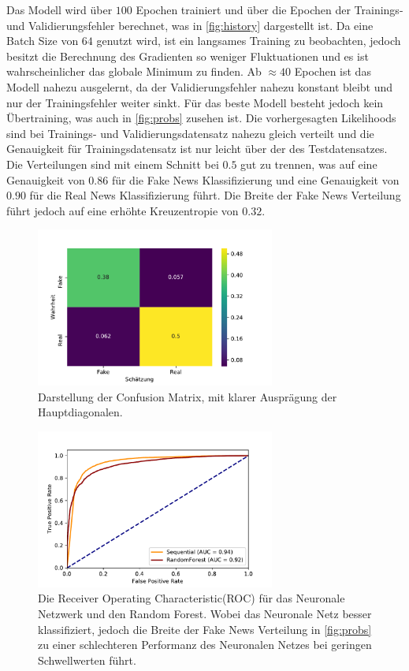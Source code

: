 Das Modell wird über $100$ Epochen trainiert und über die Epochen der Trainings- und Validierungsfehler 
berechnet, was in \autoref{fig:history} dargestellt ist. 
Da eine Batch Size von $64$ genutzt wird, ist ein langsames Training zu beobachten, jedoch besitzt die Berechnung 
des Gradienten so weniger Fluktuationen und es ist wahrscheinlicher das globale Minimum zu finden. 
Ab $\approx 40$ Epochen ist das Modell nahezu ausgelernt, da der Validierungsfehler nahezu konstant bleibt und 
nur der Trainingsfehler weiter sinkt.
Für das beste Modell besteht jedoch kein Übertraining, was auch in \autoref{fig:probs} zusehen ist.
Die vorhergesagten Likelihoods sind bei Trainings- und Validierungsdatensatz nahezu gleich verteilt und die 
Genauigkeit für Trainingsdatensatz ist nur leicht über der des Testdatensatzes.
Die Verteilungen sind mit einem Schnitt bei $0.5$ gut zu trennen, was auf eine Genauigkeit von $0.86$ für die 
Fake News Klassifizierung und eine Genauigkeit von $0.90$ für die Real News Klassifizierung führt.
Die Breite der Fake News Verteilung führt jedoch auf eine erhöhte Kreuzentropie von $0.32$.

\begin{figure}
    \centering
    \includegraphics[width=0.7\textwidth]{pictures/cnfsn_mtx_bow_best_nn.pdf}
    \caption{Darstellung der Confusion Matrix, mit klarer Ausprägung der Hauptdiagonalen.}
    \label{fig:CM}
\end{figure}
\begin{figure}
    \centering
    \includegraphics[width=0.7\textwidth]{pictures/roc_comparison.pdf}
    \caption{Die Receiver Operating Characteristic(ROC) für das Neuronale Netzwerk und den Random Forest. Wobei 
            das Neuronale Netz besser klassifiziert, jedoch die Breite der Fake News Verteilung in \ref{fig:probs}
            zu einer schlechteren Performanz des Neuronalen Netzes bei geringen Schwellwerten führt.}
    \label{fig:ROC}
\end{figure}

